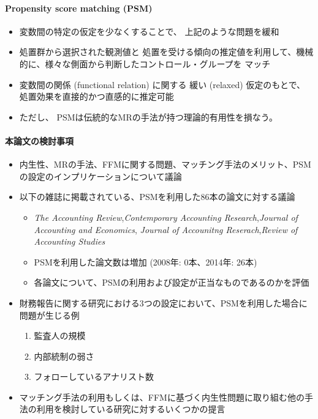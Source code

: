 \begin{itemize}
\paragraph{Propensity score matching (PSM)}
\begin{itemize}
 \item 変数間の特定の仮定を少なくすることで、
       上記のような問題を緩和
 \item 処置群から選択された観測値と
       処置を受ける傾向の推定値を利用して、機械的に、様々な側面から判断したコントロール・グループを
       マッチ
 \item 変数間の関係 (functional relation) に関する
       緩い (relaxed) 仮定のもとで、処置効果を直接的かつ直感的に推定可能
 \item ただし、
       PSMは伝統的なMRの手法が持つ理論的有用性を損なう。
\end{itemize}

\paragraph{本論文の検討事項}
\begin{itemize}
 \item 内生性、MRの手法、FFMに関する問題、マッチング手法のメリット、PSMの設定のインプリケーションについて議論
 \item 以下の雑誌に掲載されている、PSMを利用した86本の論文に対する議論
       \begin{itemize}
        \item \textit{The Accounting Review},\textit{Contemporary Accounting Research},\textit{Journal of Accounting and Economics},
              \textit{Journal of Accounitng Reserach},\textit{Review of Accounting Studies}
        \item PSMを利用した論文数は増加 (2008年: 0本、2014年: 26本)
        \item 各論文について、PSMの利用および設定が正当なものであるのかを評価
       \end{itemize}
 \item 財務報告に関する研究における3つの設定において、PSMを利用した場合に問題が生じる例
       \begin{enumerate}
        \item 監査人の規模
        \item 内部統制の弱さ
        \item フォローしているアナリスト数
       \end{enumerate}
 \item マッチング手法の利用もしくは、FFMに基づく内生性問題に取り組む他の手法の利用を検討している研究に対するいくつかの提言
\end{itemize}


\end{itemize}
